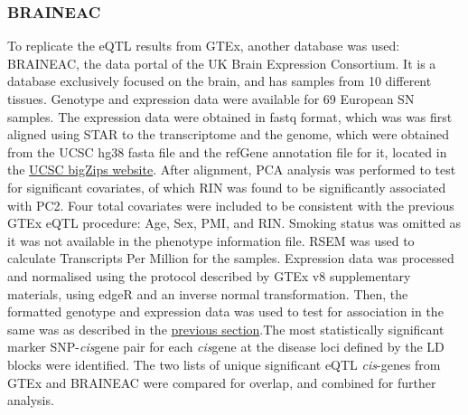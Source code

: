\documentclass{article}
\begin{document}
\subsubsection{BRAINEAC}
To replicate the eQTL results from GTEx, another database was used: BRAINEAC\cite{Ramasamy2014GeneticBrain}, the data portal of the UK Brain Expression Consortium. It is a database exclusively focused on the brain, and has samples from 10 different tissues. Genotype and expression data were available for 69  European SN samples. The expression data were obtained in fastq format, which was was first aligned using STAR\cite{Dobin2013STAR:Aligner} to the transcriptome and the genome, which were obtained from the UCSC hg38 fasta file and the refGene annotation file for it, located in the \href{https://hgdownload.soe.ucsc.edu/goldenPath/hg38/bigZips/}{UCSC bigZips website}. After alignment, PCA analysis was performed to test for significant covariates, of which RIN was found to be significantly associated with PC2. Four total covariates were included to be consistent with the previous GTEx eQTL procedure: Age, Sex, PMI, and RIN. Smoking status was omitted as it was not available in the phenotype information file. RSEM\cite{Li2011RSEM:Genome} was used to calculate Transcripts Per Million for the samples. Expression data was processed and normalised using the protocol described by GTEx v8 supplementary materials\cite{Aguet2020TheTissues}, using edgeR\cite{Robinson2010ttedgeR/ttData} and an inverse normal transformation. Then, the formatted genotype and expression data was used to test for association in the same was as described in the \hyperref[subsec:GTEx]{previous section}.The most statistically significant marker SNP-\textit{cis}gene pair for each \textit{cis}gene at the disease loci defined by the LD blocks were identified. The two lists of unique significant eQTL \textit{cis}-genes from GTEx and BRAINEAC were compared for overlap, and combined for further analysis. 
\end{document}
